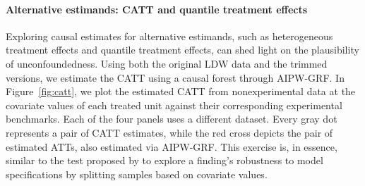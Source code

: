 \documentclass[letterpaper,12pt,leqno]{article}
\begin{document}
\FloatBarrier

\paragraph{Alternative estimands: CATT and quantile treatment effects} Exploring causal estimates for alternative estimands, such as heterogeneous treatment effects and quantile treatment effects, can shed light on the plausibility of unconfoundedness. Using both the original LDW data and the trimmed versions, we estimate the CATT using a causal forest through AIPW-GRF. In Figure~\ref{fig:catt}, we plot the estimated CATT from nonexperimental data at the covariate values of each treated unit against their corresponding experimental benchmarks. Each of the four panels uses a different dataset. Every gray dot represents a pair of CATT estimates, while the red cross depicts the pair of estimated ATTs, also estimated via AIPW-GRF. This exercise is, in essence, similar to the test proposed by \cite{atheyimbens_robust} to explore a finding's robustness to model specifications by splitting samples based on covariate values.
\end{document}
